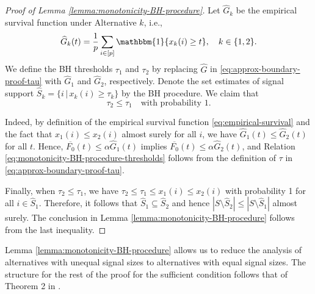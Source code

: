 \begin{proof}[Proof of Lemma \ref{lemma:monotonicity-BH-procedure}]
Let $\widehat{G}_k$ be the empirical survival function under Alternative $k$, i.e.,
\begin{equation} \label{eq:empirical-survival}
    \widehat{G}_k(t) = \frac{1}{p}\sum_{i\in[p]}\mathbbm{1}\{x_k(i) \ge t\}, \quad k\in\{1,2\}.
\end{equation}
We define the BH thresholds $\tau_1$ and $\tau_2$ by replacing $\widehat{G}$ in \eqref{eq:approx-boundary-proof-tau} with $\widehat{G}_1$ and $\widehat{G}_2$, respectively.
Denote the set estimates of signal support $\widehat{S}_k = \{i\,|\,x_k(i)\ge\tau_k\}$ by the BH procedure.
We claim that
\begin{equation} \label{eq:monotonicity-BH-procedure-thresholds}
    \tau_2 \le \tau_1 \quad \text{with probability } 1.
\end{equation}

Indeed, by definition of the empirical survival function \eqref{eq:empirical-survival} and the fact that $x_1(i) \le x_2(i)$ almost surely for all $i$,  we have $\widehat{G}_1(t) \le \widehat{G}_2(t)$ for all $t$.
Hence, $\overline{F_0}(t)\le\alpha\widehat{G}_1(t)$ implies $\overline{F_0}(t)\le\alpha\widehat{G}_2(t)$, and Relation \eqref{eq:monotonicity-BH-procedure-thresholds} follows from the definition of $\tau$ in \eqref{eq:approx-boundary-proof-tau}.

Finally, when $\tau_2 \le \tau_1$, we have $\tau_2 \le \tau_1 \le x_1(i) \le x_2(i)$ with probability 1 for all $i\in\widehat{S}_1$.
Therefore, it follows that $\widehat{S}_1 \subseteq \widehat{S}_2$ and hence $|S\setminus\widehat{S}_2| \le |S\setminus\widehat{S}_1|$ almost surely. 
The conclusion in Lemma \ref{lemma:monotonicity-BH-procedure} follows from the last inequality.
\end{proof}

Lemma \ref{lemma:monotonicity-BH-procedure} allows us to reduce the analysis of alternatives with unequal signal sizes to alternatives with equal signal sizes. 
The structure for the rest of the proof for the sufficient condition follows that of Theorem 2 in \cite{arias2017distribution}. 

